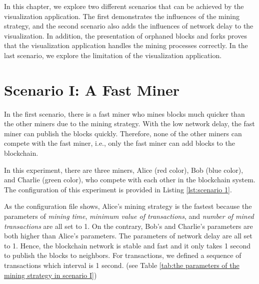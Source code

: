 In this chapter, we explore two different scenarios that can be achieved by the visualization application. The first demonstrates the influences of the mining strategy, and the second scenario also adds the influences of network delay to the visualization. In addition, the presentation of orphaned blocks and forks proves that the visualization application handles the mining processes correctly. In the last scenario, we explore the limitation of the visualization application.

\section{Scenario I: A Fast Miner}

In the first scenario, there is a fast miner who mines blocks much quicker than the other miners due to the mining strategy. With the low network delay, the fast miner can publish the blocks quickly. Therefore, none of the other miners can compete with the fast miner, i.e., only the fast miner can add blocks to the blockchain.

In this experiment, there are three miners, Alice (red color), Bob (blue color), and Charlie (green color), who compete with each other in the blockchain system. The configuration of this experiment is provided in Listing \ref{lst:scenario 1}.

As the configuration file shows, Alice's mining strategy is the fastest because the parameters of \textit{mining time}, \textit{minimum value of transactions}, and \textit{number of mined transactions} are all set to 1. On the contrary, Bob's and Charlie's parameters are both higher than Alice's parameters. The parameters of network delay are all set to 1. Hence, the blockchain network is stable and fast and it only takes 1 second to publish the blocks to neighbors. For transactions, we defined a sequence of transactions which interval is 1 second. (see Table \ref{tab:the parameters of the mining strategy in scenario I})

